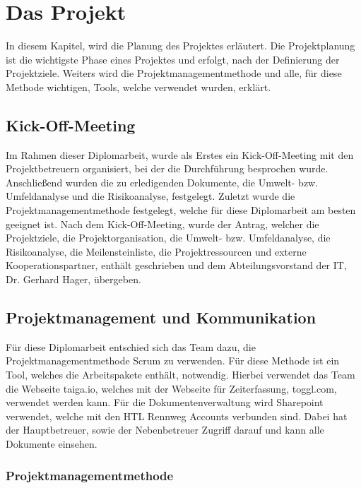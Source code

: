 \chapter{Das Projekt}
\renewcommand{\kapitelautor}{Autor: Hatice Akyokus}

In diesem Kapitel, wird die Planung des Projektes erläutert. Die Projektplanung ist die wichtigste Phase eines Projektes und erfolgt, nach der Definierung der Projektziele.   Weiters wird die Projektmanagementmethode und alle, für diese Methode wichtigen, Tools, welche verwendet wurden, erklärt.

\section{Kick-Off-Meeting}

Im Rahmen dieser Diplomarbeit, wurde als Erstes ein Kick-Off-Meeting mit den Projektbetreuern organisiert, bei der die Durchführung besprochen wurde. Anschließend wurden die zu erledigenden Dokumente, die Umwelt- bzw. Umfeldanalyse und die Risikoanalyse, festgelegt. Zuletzt wurde die Projektmanagementmethode festgelegt, welche für diese Diplomarbeit am besten geeignet ist. Nach dem Kick-Off-Meeting, wurde der Antrag, welcher die Projektziele, die Projektorganisation, die Umwelt- bzw. Umfeldanalyse, die Risikoanalyse, die Meilensteinliste, die Projektressourcen und externe Kooperationspartner, enthält geschrieben und dem Abteilungsvorstand der IT, Dr. Gerhard Hager, übergeben.

\section{Projektmanagement und Kommunikation}

Für diese Diplomarbeit entschied sich das Team dazu, die Projektmanagementmethode Scrum zu verwenden. Für diese Methode ist ein Tool, welches die Arbeitspakete enthält, notwendig. Hierbei verwendet das Team die Webseite taiga.io, welches mit der Webseite für Zeiterfassung, toggl.com, verwendet werden kann. Für die Dokumentenverwaltung wird Sharepoint verwendet, welche mit den HTL Rennweg Accounts verbunden sind. Dabei hat der Hauptbetreuer, sowie der Nebenbetreuer Zugriff darauf und kann alle Dokumente einsehen.

\subsection{Projektmanagementmethode} 

